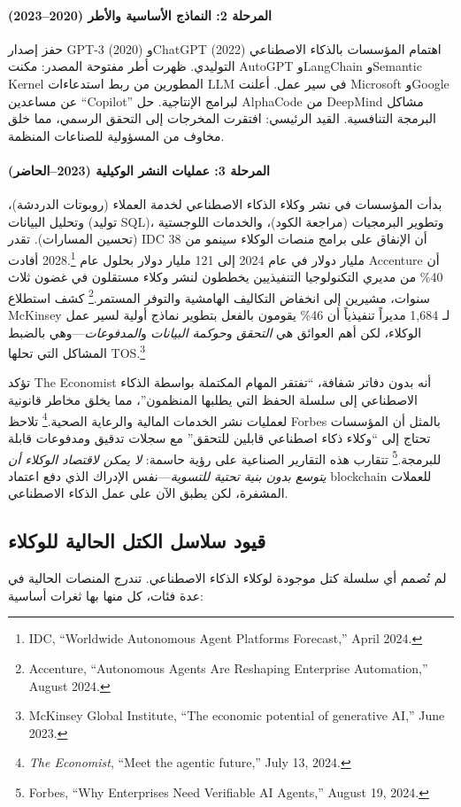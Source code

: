 \documentclass[11pt]{article}
\begin{document}
\paragraph{المرحلة 2: النماذج الأساسية والأطر (2020--2023)} حفز إصدار GPT-3 (2020) وChatGPT (2022) اهتمام المؤسسات بالذكاء الاصطناعي التوليدي. ظهرت أطر مفتوحة المصدر: مكنت AutoGPT وLangChain وSemantic Kernel المطورين من ربط استدعاءات LLM في سير عمل. أعلنت Microsoft وGoogle عن مساعدين ``Copilot'' لبرامج الإنتاجية. حل AlphaCode من DeepMind مشاكل البرمجة التنافسية. القيد الرئيسي: افتقرت المخرجات إلى التحقق الرسمي، مما خلق مخاوف من المسؤولية للصناعات المنظمة.

\paragraph{المرحلة 3: عمليات النشر الوكيلية (2023--الحاضر)} بدأت المؤسسات في نشر وكلاء الذكاء الاصطناعي لخدمة العملاء (روبوتات الدردشة)، وتحليل البيانات (توليد SQL)، وتطوير البرمجيات (مراجعة الكود)، والخدمات اللوجستية (تحسين المسارات). تقدر IDC أن الإنفاق على برامج منصات الوكلاء سينمو من 38 مليار دولار في عام 2024 إلى 121 مليار دولار بحلول عام 2028.\footnote{IDC, ``Worldwide Autonomous Agent Platforms Forecast,'' April 2024.} أفادت Accenture أن 40\% من مديري التكنولوجيا التنفيذيين يخططون لنشر وكلاء مستقلون في غضون ثلاث سنوات، مشيرين إلى انخفاض التكاليف الهامشية والتوفر المستمر.\footnote{Accenture, ``Autonomous Agents Are Reshaping Enterprise Automation,'' August 2024.} كشف استطلاع McKinsey لـ 1,684 مديراً تنفيذياً أن 46\% يقومون بالفعل بتطوير نماذج أولية لسير عمل الوكلاء، لكن أهم العوائق هي \emph{التحقق} و\emph{حوكمة البيانات} و\emph{المدفوعات}---وهي بالضبط المشاكل التي تحلها TOS.\footnote{McKinsey Global Institute, ``The economic potential of generative AI,'' June 2023.}

تؤكد The Economist أنه بدون دفاتر شفافة، ``تفتقر المهام المكتملة بواسطة الذكاء الاصطناعي إلى سلسلة الحفظ التي يطلبها المنظمون''، مما يخلق مخاطر قانونية لعمليات نشر الخدمات المالية والرعاية الصحية.\footnote{\emph{The Economist}, ``Meet the agentic future,'' July 13, 2024.} تلاحظ Forbes بالمثل أن المؤسسات تحتاج إلى ``وكلاء ذكاء اصطناعي قابلين للتحقق'' مع سجلات تدقيق ومدفوعات قابلة للبرمجة.\footnote{Forbes, ``Why Enterprises Need Verifiable AI Agents,'' August 19, 2024.} تتقارب هذه التقارير الصناعية على رؤية حاسمة: \emph{لا يمكن لاقتصاد الوكلاء أن يتوسع بدون بنية تحتية للتسوية}---نفس الإدراك الذي دفع اعتماد blockchain للعملات المشفرة، لكن يطبق الآن على عمل الذكاء الاصطناعي.

\subsection{قيود سلاسل الكتل الحالية للوكلاء}
لم تُصمم أي سلسلة كتل موجودة لوكلاء الذكاء الاصطناعي. تندرج المنصات الحالية في عدة فئات، كل منها بها ثغرات أساسية:
\end{document}
